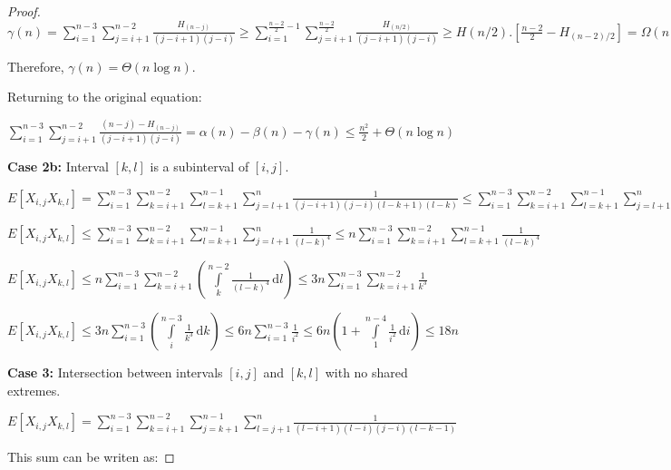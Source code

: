 \documentclass[12pt]{article}
\begin{document}
\begin{proof}
$\gamma(n) =  \sum\limits_{i=1}^{n-3} \sum\limits_{j=i+1}^{n-2} \frac{H_{(n - j)}} {(j-i+1)(j-i)}
\geq  \sum\limits_{i=1}^{\frac{n-2}{2} - 1} \sum\limits_{j=i+1}^{\frac{n-2}{2}} \frac{H_{(n/2)}} {(j-i+1)(j-i)}
\geq  H(n/2) . \left[\frac{n-2}{2} - H_{(n-2)/2} \right] = \Omega(n \log n) $

Therefore, $\gamma(n) = \Theta(n \log n)$.


Returning to the original equation:

$\sum\limits_{i=1}^{n-3} \sum\limits_{j=i+1}^{n-2} \frac{(n - j) - H_{(n - j)}} {(j-i+1)(j-i)} 
= \alpha(n) - \beta(n) - \gamma(n)
\leq  \frac{n^2}{2} + \Theta(n \log n)$

\vspace{0.5cm}

{\bf Case 2b:} Interval $[k, l]$ is a subinterval of $[i, j]$.

$E[X_{i,j} X_{k,l}] = \sum\limits_{i=1}^{n-3} \sum\limits_{k=i+1}^{n-2}
\sum\limits_{l=k+1}^{n-1} \sum\limits_{j=l+1}^{n} \frac{1}{(j-i+1)(j-i)(l-k+1)(l-k)}
\leq  \sum\limits_{i=1}^{n-3} \sum\limits_{k=i+1}^{n-2}
\sum\limits_{l=k+1}^{n-1} \sum\limits_{j=l+1}^{n} \frac{1}{(l-k+1)(l-k)(l-k+1)(l-k)}$

$E[X_{i,j} X_{k,l}] \leq\sum\limits_{i=1}^{n-3} \sum\limits_{k=i+1}^{n-2}
\sum\limits_{l=k+1}^{n-1} \sum\limits_{j=l+1}^{n} \frac{1}{(l-k)^4}
\leq n \sum\limits_{i=1}^{n-3} \sum\limits_{k=i+1}^{n-2}
\sum\limits_{l=k+1}^{n-1}  \frac{1}{(l-k)^4} $

$E[X_{i,j} X_{k,l}] \leq n \sum\limits_{i=1}^{n-3} \sum\limits_{k=i+1}^{n-2}
\left( \displaystyle \int\limits_{k}^{n-2} \! \frac{1}{(l-k)^4} \, \mathrm{d}l \right)
\leq 3n \sum\limits_{i=1}^{n-3} \sum\limits_{k=i+1}^{n-2} \frac{1}{k^3} $

$E[X_{i,j} X_{k,l}]  \leq 3n \sum\limits_{i=1}^{n-3}
\left( \displaystyle \int\limits_{i}^{n-3} \! \frac{1}{k^3} \, \mathrm{d}k \right)
\leq 6n \sum\limits_{i=1}^{n-3} \frac{1}{i^2}
 \leq 6n \left( 1 + \displaystyle \int\limits_{1}^{n-4} \! \frac{1}{i^2} \, \mathrm{d}i \right)
 \leq 18n$

\vspace{0.5cm}

{\bf Case 3:} Intersection between intervals $[i, j]$ and $[k, l]$ with no shared extremes.

$E[X_{i,j} X_{k,l}] = \sum\limits_{i=1}^{n-3} \sum\limits_{k=i+1}^{n-2}
\sum\limits_{j=k+1}^{n-1} \sum\limits_{l=j+1}^{n} \frac{1}{(l-i+1)(l-i)(j-i)(l-k-1)}$

This sum can be writen as:


\end{proof}
\end{document}
